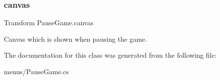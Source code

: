 \subsubsection{\texorpdfstring{canvas}{canvas}}
{\footnotesize\ttfamily Transform Pause\+Game.\+canvas}



Canvas which is shown when pausing the game. 



The documentation for this class was generated from the following file\+:\begin{DoxyCompactItemize}
\item 
menus/Pause\+Game.\+cs\end{DoxyCompactItemize}
